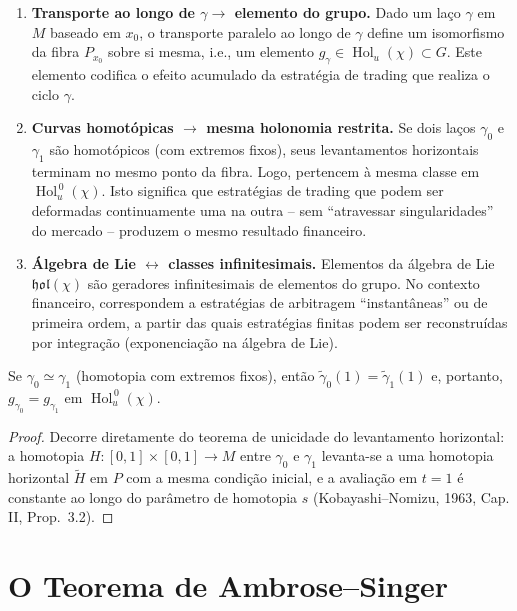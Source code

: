 \begin{enumerate}
 \item \textbf{Transporte ao longo de \(\gamma \to\) elemento do grupo.} Dado um la\c{c}o \(\gamma\) em \(M\) baseado em \(x_0\), o transporte paralelo ao longo de \(\gamma\) define um isomorfismo da fibra \(P_{x_0}\) sobre si mesma, i.e., um elemento \(g_\gamma \in \operatorname{Hol}_{u}(\chi) \subset G\). Este elemento codifica o efeito acumulado da estrat\'egia de trading que realiza o ciclo \(\gamma\).

 \item \textbf{Curvas homot\'opicas \(\to\) mesma holonomia restrita.} Se dois la\c{c}os \(\gamma_0\) e \(\gamma_1\) s\~ao homot\'opicos (com extremos fixos), seus levantamentos horizontais terminam no mesmo ponto da fibra. Logo, pertencem \`a mesma classe em \(\operatorname{Hol}_u^{\,0}(\chi)\). Isto significa que estrat\'egias de trading que podem ser deformadas continuamente uma na outra -- sem ``atravessar singularidades'' do mercado -- produzem o mesmo resultado financeiro.

 \item \textbf{\'Algebra de Lie \(\leftrightarrow\) classes infinitesimais.} Elementos da \'algebra de Lie \(\mathfrak{hol}(\chi)\) s\~ao geradores infinitesimais de elementos do grupo. No contexto financeiro, correspondem a estrat\'egias de arbitragem ``instant\^aneas'' ou de primeira ordem, a partir das quais estrat\'egias finitas podem ser reconstru\'idas por integra\c{c}\~ao (exponencia\c{c}\~ao na \'algebra de Lie).
\end{enumerate}

\begin{prop}
Se \(\gamma_0 \simeq \gamma_1\) (homotopia com extremos fixos), ent\~ao \(\tilde{\gamma}_0(1) = \tilde{\gamma}_1(1)\) e, portanto, \(g_{\gamma_0} = g_{\gamma_1}\) em \(\operatorname{Hol}_u^{\,0}(\chi)\).
\end{prop}

\begin{proof}
Decorre diretamente do teorema de unicidade do levantamento horizontal: a homotopia \(H: [0,1] \times [0,1] \to M\) entre \(\gamma_0\) e \(\gamma_1\) levanta-se a uma homotopia horizontal \(\tilde{H}\) em \(P\) com a mesma condi\c{c}\~ao inicial, e a avalia\c{c}\~ao em \(t=1\) \'e constante ao longo do par\^ametro de homotopia \(s\) (Kobayashi--Nomizu, 1963, Cap. II, Prop.~3.2).
\end{proof}

\section{O Teorema de Ambrose--Singer}

